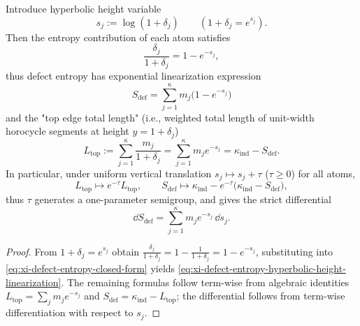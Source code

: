 \begin{proposition}\label{prop:xi-defect-entropy-hyperbolic-height-semigroup}
Introduce hyperbolic height variable
\[
s_j:=\log(1+\delta_j)\qquad(1+\delta_j=e^{s_j}).
\]
Then the entropy contribution of each atom satisfies
\[
\frac{\delta_j}{1+\delta_j}=1-e^{-s_j},
\]
thus defect entropy has exponential linearization expression
\begin{equation}\label{eq:xi-defect-entropy-hyperbolic-height-linearization}
\boxed{\;
S_{\mathrm{def}}=\sum_{j=1}^{\kappa}m_j\bigl(1-e^{-s_j}\bigr)\;}
\end{equation}
and the "top edge total length" (i.e., weighted total length of unit-width horocycle segments at height \(y=1+\delta_j\))
\[
L_{\mathrm{top}}
:=\sum_{j=1}^{\kappa}\frac{m_j}{1+\delta_j}
=\sum_{j=1}^{\kappa}m_j e^{-s_j}
=\kappa_{\mathrm{ind}}-S_{\mathrm{def}}.
\]
In particular, under uniform vertical translation \(s_j\mapsto s_j+\tau\) (\(\tau\ge 0\)) for all atoms,
\[
L_{\mathrm{top}}\mapsto e^{-\tau}L_{\mathrm{top}},
\qquad
S_{\mathrm{def}}\mapsto \kappa_{\mathrm{ind}}-e^{-\tau}\bigl(\kappa_{\mathrm{ind}}-S_{\mathrm{def}}\bigr),
\]
thus \(\tau\) generates a one-parameter semigroup, and gives the strict differential
\[
\dd S_{\mathrm{def}}=\sum_{j=1}^{\kappa} m_j e^{-s_j}\,\dd s_j.
\]
\end{proposition}

\begin{proof}
From \(1+\delta_j=e^{s_j}\) obtain
\(
\frac{\delta_j}{1+\delta_j}=1-\frac{1}{1+\delta_j}=1-e^{-s_j}
\), substituting into \eqref{eq:xi-defect-entropy-closed-form} yields \eqref{eq:xi-defect-entropy-hyperbolic-height-linearization}.
The remaining formulas follow term-wise from algebraic identities
\(
L_{\mathrm{top}}=\sum_j m_j e^{-s_j}
\)
and
\(
S_{\mathrm{def}}=\kappa_{\mathrm{ind}}-L_{\mathrm{top}}
\);
the differential follows from term-wise differentiation with respect to \(s_j\).
\end{proof}

